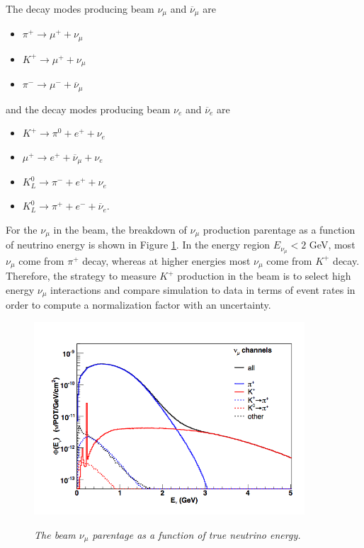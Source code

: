The decay modes producing beam $\nu_\mu$ and $\overline{\nu}_\mu$ are
\begin{itemize}
	\item $\pi^+\rightarrow\mu^++\nu_\mu$
	\item $K^+\rightarrow\mu^++\nu_\mu$
	\item $\pi^-\rightarrow\mu^-+\overline{\nu}_\mu$
\end{itemize}
and the decay modes producing beam $\nu_e$ and $\overline{\nu}_e$ are
\begin{itemize}
	\item $K^+ \rightarrow \pi^0 + e^+ + \nu_e$
	\item $\mu^+ \rightarrow e^+ + \overline{\nu}_\mu + \nu_e$
	\item $K^0_L \rightarrow \pi^- + e^+ + \nu_e$
	\item $K^0_L \rightarrow \pi^+ + e^- + \overline{\nu}_e$.
\end{itemize}

For the $\nu_\mu$ in the beam, the breakdown of $\nu_\mu$ production parentage as a function of neutrino energy is shown in Figure \ref{bnb_numu_breakdown_fig}. In the energy region $E_{\nu_\mu} < 2$ GeV, most $\nu_\mu$ come from $\pi^+$ decay, whereas at higher energies most $\nu_\mu$ come from $K^+$ decay. Therefore, the strategy to measure $K^+$ production in the beam is to select high energy $\nu_\mu$ interactions and compare simulation to data in terms of event rates in order to compute a normalization factor with an uncertainty.\\

\begin{figure}[ht!]
\centering
	\includegraphics[width=0.9\textwidth]{Figures/bnb_numu_breakdown.png} \\
\caption{\textit{The beam $\nu_\mu$ parentage as a function of true neutrino energy.}}\label{bnb_numu_breakdown_fig}
\end{figure}

